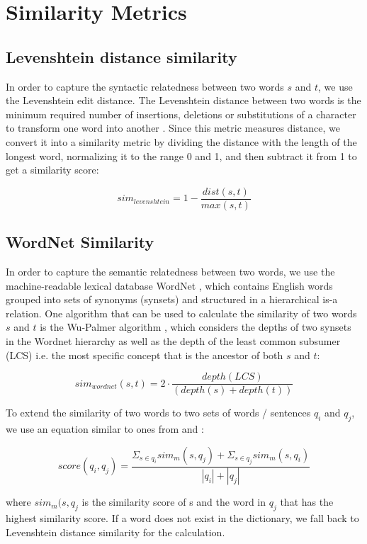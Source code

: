 \section{Similarity Metrics}

\subsection{Levenshtein distance similarity}

In order to capture the syntactic relatedness between two words \(s\) and \(t\), we use the Levenshtein edit distance. The Levenshtein distance between two words is the minimum required number of insertions, deletions or substitutions of a character to transform one word into another \cite{levenshtein}. Since this metric measures distance, we convert it into a similarity metric by dividing the distance with the length of the longest word, normalizing it to the range 0 and 1, and then subtract it from 1 to get a similarity score:

\[sim_{levenshtein} = 1 - \frac{dist(s, t)}{max(s, t)}\]

\subsection{WordNet Similarity}\label{wordnet}

In order to capture the semantic relatedness between two words, we use the machine-readable lexical database WordNet \cite{wordnet}, which contains English words grouped into sets of synonyms (synsets) and structured in a hierarchical is-a relation. One algorithm that can be used to calculate the similarity of two words \(s\) and \(t\) is the Wu-Palmer algorithm \cite{wuPalmer}, which considers the depths of two synsets in the Wordnet hierarchy as well as the depth of the least common subsumer (LCS) i.e. the most specific concept that is the ancestor of both \(s\) and \(t\):

\[sim_{wordnet}(s, t) = 2 \cdot \frac{depth(LCS)}{(depth(s) + depth(t))}\]

To extend the similarity of two words to two sets of words / sentences \(q_i\) and \(q_j\), we use an equation similar to ones from \cite{wordnetSim} and \cite{cupid}:

\[score(q_i, q_j) = \frac{\Sigma_{s \in q_i} sim_m(s, q_j) +\Sigma_{s \in q_j} sim_m(s, q_i)}{|q_i| + |q_j|}\]

where \(sim_m(s, q_j\) is the similarity score of s and the word in \(q_j\) that has the highest similarity score. If a word does not exist in the dictionary, we fall back to Levenshtein distance similarity for the calculation.

